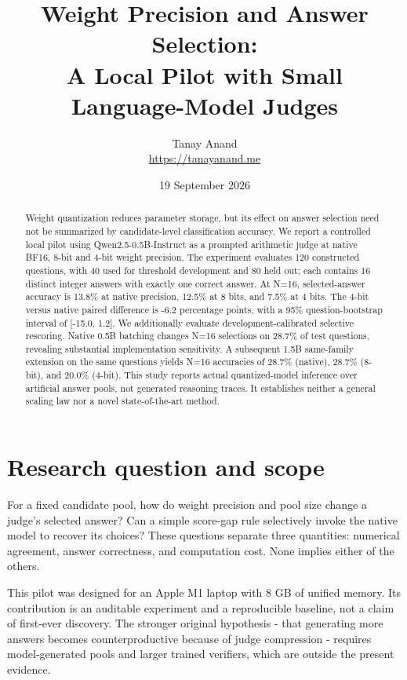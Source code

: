 \documentclass[11pt,letterpaper]{article}
\title{Weight Precision and Answer Selection:\\A Local Pilot with Small Language-Model Judges}
\author{Tanay Anand\\\small\url{https://tanayanand.me}}
\date{19 September 2026}
\begin{document}
\maketitle
\begin{abstract}Weight quantization reduces parameter storage, but its effect on answer selection need not be summarized by candidate-level classification accuracy. We report a controlled local pilot using Qwen2.5-0.5B-Instruct as a prompted arithmetic judge at native BF16, 8-bit and 4-bit weight precision. The experiment evaluates 120 constructed questions, with 40 used for threshold development and 80 held out; each contains 16 distinct integer answers with exactly one correct answer. At N=16, selected-answer accuracy is 13.8\% at native precision, 12.5\% at 8 bits, and 7.5\% at 4 bits. The 4-bit versus native paired difference is -6.2 percentage points, with a 95\% question-bootstrap interval of [-15.0, 1.2]. We additionally evaluate development-calibrated selective rescoring. Native 0.5B batching changes N=16 selections on 28.7\% of test questions, revealing substantial implementation sensitivity. A subsequent 1.5B same-family extension on the same questions yields N=16 accuracies of 28.7\% (native), 28.7\% (8-bit), and 20.0\% (4-bit). This study reports actual quantized-model inference over artificial answer pools, not generated reasoning traces. It establishes neither a general scaling law nor a novel state-of-the-art method.\end{abstract}

\section{Research question and scope}

For a fixed candidate pool, how do weight precision and pool size change a judge's selected answer? Can a simple score-gap rule selectively invoke the native model to recover its choices? These questions separate three quantities: numerical agreement, answer correctness, and computation cost. None implies either of the others.


This pilot was designed for an Apple M1 laptop with 8 GB of unified memory. Its contribution is an auditable experiment and a reproducible baseline, not a claim of first-ever discovery. The stronger original hypothesis - that generating more answers becomes counterproductive because of judge compression - requires model-generated pools and larger trained verifiers, which are outside the present evidence.
\end{document}
